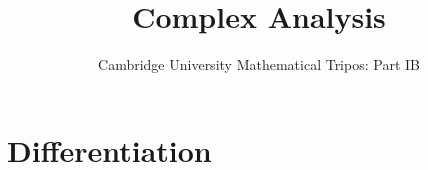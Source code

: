 \documentclass{article}
\title{Complex Analysis}
\author{Cambridge University Mathematical Tripos: Part IB}
\begin{document}
\maketitle

\tableofcontentsnewpage{}

\section{Differentiation}

\end{document}

